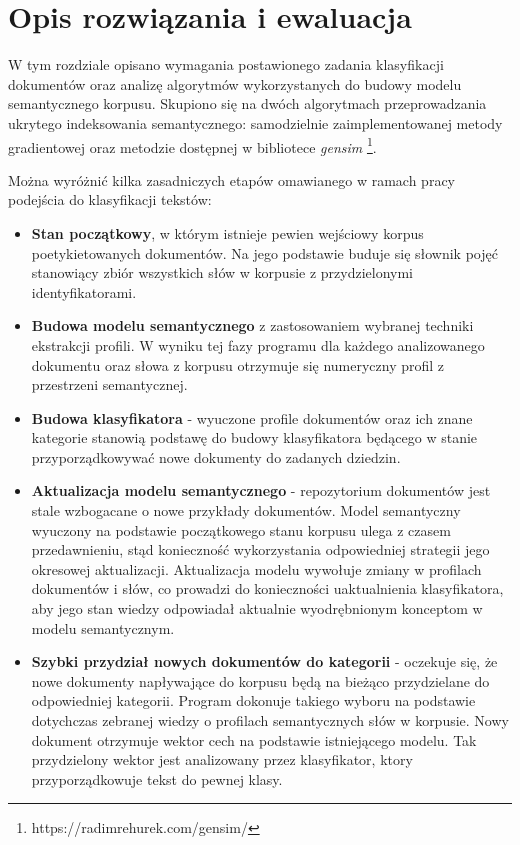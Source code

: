 \documentclass{pracamgr}
\begin{document}
\chapter{Opis rozwiązania i ewaluacja}

W tym rozdziale opisano wymagania postawionego zadania klasyfikacji dokumentów oraz analizę algorytmów wykorzystanych do budowy modelu semantycznego korpusu. Skupiono się na dwóch algorytmach przeprowadzania ukrytego indeksowania semantycznego: samodzielnie zaimplementowanej metody gradientowej oraz metodzie dostępnej w bibliotece \textit{gensim} \footnote{https://radimrehurek.com/gensim/}.


Można wyróżnić kilka zasadniczych etapów omawianego w ramach pracy podejścia do klasyfikacji tekstów:

\begin{itemize}
    \item \textbf{Stan początkowy}, w którym istnieje pewien wejściowy korpus poetykietowanych dokumentów. Na jego podstawie buduje się słownik pojęć stanowiący zbiór wszystkich słów w korpusie z przydzielonymi identyfikatorami.
    \item \textbf{Budowa modelu semantycznego} z zastosowaniem wybranej techniki ekstrakcji profili. W wyniku tej fazy programu dla każdego analizowanego dokumentu oraz słowa z korpusu otrzymuje się numeryczny profil z przestrzeni semantycznej.
    \item \textbf{Budowa klasyfikatora} - wyuczone profile dokumentów oraz ich znane kategorie stanowią podstawę do budowy klasyfikatora będącego w stanie przyporządkowywać nowe dokumenty do zadanych dziedzin.
    \item \textbf{Aktualizacja modelu semantycznego} - repozytorium dokumentów jest stale wzbogacane o nowe przykłady dokumentów. Model semantyczny wyuczony na podstawie początkowego stanu korpusu ulega z czasem przedawnieniu, stąd konieczność wykorzystania odpowiedniej strategii jego okresowej aktualizacji. Aktualizacja modelu wywołuje zmiany w profilach dokumentów i słów, co prowadzi do konieczności uaktualnienia klasyfikatora, aby jego stan wiedzy odpowiadał aktualnie wyodrębnionym konceptom w modelu semantycznym.
    \item \textbf{Szybki przydział nowych dokumentów do kategorii} - oczekuje się, że nowe dokumenty napływające do korpusu będą na bieżąco przydzielane do odpowiedniej kategorii. Program dokonuje takiego wyboru na podstawie dotychczas zebranej wiedzy o profilach semantycznych słów w korpusie. Nowy dokument otrzymuje wektor cech na podstawie istniejącego modelu. Tak przydzielony wektor jest analizowany przez klasyfikator, ktory przyporządkowuje tekst do pewnej klasy.
    
\end{itemize}
\end{document}
